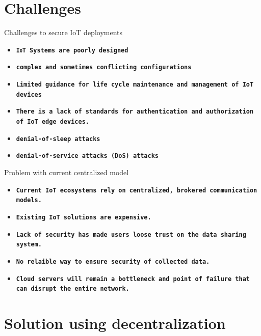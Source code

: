\documentclass[10pt]{beamer}
\newcommand{\themename}{\textbf{\textsc{IoT}}\xspace}
\begin{document}
\section{Challenges}

\begin{frame}[fragile]{Challenges to secure IoT deployments}
	\begin{itemize}
		\item \texttt{\textbf{\themename Systems are poorly designed}}
		\item \texttt{\textbf{complex and
sometimes conflicting configurations}}
		\item \texttt{\textbf{Limited guidance for life cycle maintenance and management of IoT devices}}
		\item \texttt{\textbf{There is a lack of standards for authentication and authorization of IoT edge devices.}}
				\item \texttt{\textbf{denial-of-sleep attacks}}
		\item \texttt{\textbf{denial-of-service attacks (DoS) attacks}}
	\end{itemize}
\end{frame}


\begin{frame}[fragile]{Problem with current centralized model}
	\begin{itemize}
		\item \texttt{\textbf{Current IoT ecosystems rely on centralized, brokered communication models.}}
		\item \texttt{\textbf{Existing IoT solutions are expensive.}}
		\item \texttt{\textbf{Lack of security has made users loose trust on the data sharing system.}}
		\item \texttt{\textbf{No relaible way to ensure security of collected data.}}
				\item \texttt{\textbf{Cloud
servers will remain a bottleneck and point of
failure that can disrupt the entire network.}}

	\end{itemize}
\end{frame}

\section{Solution using decentralization}
\end{document}
